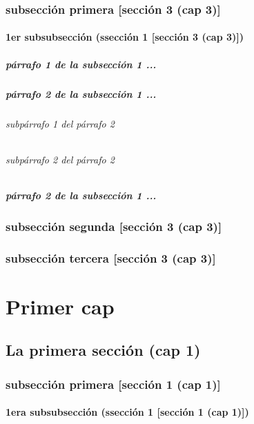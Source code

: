 \documentclass[12pt,a4paper]{report}
\begin{document}
\subsection*{subsección primera [sección 3 (cap 3)]}
\subsubsection*{1er subsubsección (ssección 1 [sección 3 (cap 3)])}
\paragraph*{párrafo 1 de la subsección 1 ...}
\paragraph*{párrafo 2 de la subsección 1 ...}
\subparagraph*{subpárrafo 1 del párrafo 2}
\subparagraph*{subpárrafo 2 del párrafo 2}
\paragraph*{párrafo 2 de la subsección 1 ...}
\subsection*{subsección segunda [sección 3 (cap 3)]}
\subsection*{subsección tercera [sección 3 (cap 3)]}



\appendix
\chapter{Primer cap}
\section{La primera sección (cap 1)}
\subsection{subsección primera [sección 1 (cap 1)]}
\subsubsection{1era subsubsección (ssección 1 [sección 1 (cap 1)])}
\end{document}
